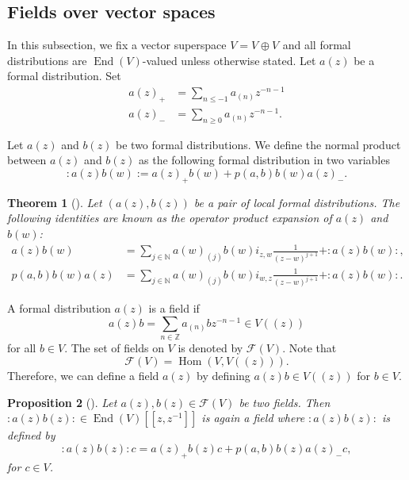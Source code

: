 \documentclass[a4paper, 12pt, reqno]{amsart}
\newtheorem{theorem}{Theorem}[subsection]
\newtheorem{proposition}[theorem]{Proposition}
\theoremstyle{remark}
\numberwithin{equation}{subsection}
\DeclareMathOperator{\End}{End}
\DeclareMathOperator{\zero}{\overline{0}}
\DeclareMathOperator{\one}{\overline{1}}
\DeclareMathOperator{\Hom}{Hom}
\begin{document}
\subsection{Fields over vector spaces}
\label{sec:fields-over-vector}

In this subsection, we fix a vector superspace $V = V_{\zero} \oplus V_{\one}$ and all formal distributions are $\End(V)$-valued unless otherwise stated.
Let $a(z)$ be a formal distribution.
Set
\begin{align*}
  a(z)_+&=\sum_{n\le -1}a_{(n)}z^{-n-1} \\
  a(z)_-&=\sum_{n\ge 0}a_{(n)}z^{-n-1}.
\end{align*}

Let $a(z)$ and $b(z)$ be two formal distributions.
We define the normal product between $a(z)$ and $b(z)$ as the following formal distribution in two variables
\begin{equation*}
  :a(z)b(w):=a(z)_+b(w)+p(a,b)b(w)a(z)_-.
\end{equation*}

\begin{theorem}[{\cite[Proposition 3.2.3]{nozaradan_introduction_2008}}]
  \label{thr:6}
  Let $(a(z), b(z))$ be a pair of local formal distributions.
  The following identities are known as the operator product expansion of $a(z)$ and $b(w)$:
  \begin{align*}
    a(z)b(w) &= \sum_{j \in \mathbb{N}}a(w)_{(j)}b(w)i_{z, w}\frac{1}{(z - w)^{j + 1}} + :a(z)b(w):, \\
    p(a, b)b(w)a(z) &= \sum_{j \in \mathbb{N}}a(w)_{(j)}b(w)i_{w, z}\frac{1}{(z - w)^{j + 1}} + :a(z)b(w):.
  \end{align*}
\end{theorem}

A formal distribution $a(z)$ is a field if
\begin{equation*}
  a(z)b = \sum_{n \in \mathbb{Z}}a_{(n)}bz^{-n - 1} \in V((z))
\end{equation*}
for all $b \in V$.
The set of fields on $V$ is denoted by $\mathcal{F}(V)$.
Note that
\begin{equation*}
  \mathcal{F}(V) = \Hom(V, V((z))).
\end{equation*}
Therefore, we can define a field $a(z)$ by defining $a(z)b \in V((z))$ for $b \in V$.

\begin{proposition}[{\cite[Proposition 3.3.2]{nozaradan_introduction_2008}}]
  \label{prp:5}
  Let $a(z), b(z)\in \mathcal{F}(V)$ be two fields.
  Then $:a(z)b(z):\in \End(V)[[z,z^{-1}]]$ is again a field where $:a(z)b(z):$ is defined by
  \begin{equation*}
    :a(z)b(z):c = a(z)_+b(z)c + p(a, b)b(z)a(z)_-c,
  \end{equation*}
  for $c \in V$.
\end{proposition}
\end{document}
